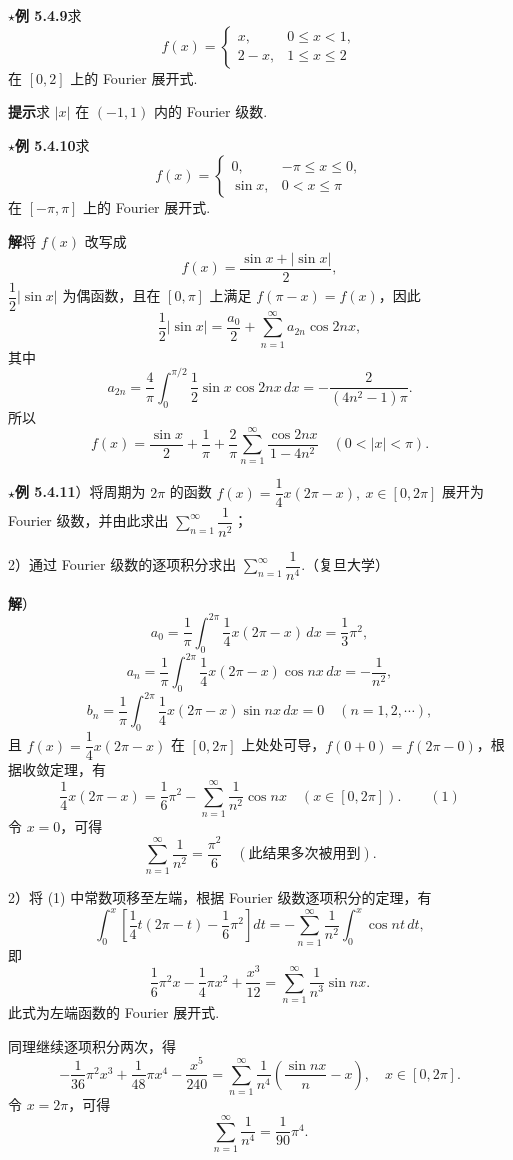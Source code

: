 \documentclass[UTF8, 12pt, fontset=fandol, oneside]{ctexart}
\begin{document}
\noindent\(\star\)\textbf{例 5.4.9}\quad 求
\[
  f(x)=
  \begin{cases}
  x,&0\le x<1,\\
  2-x,&1\le x\le2
  \end{cases}
\]
在 $[0,2]$ 上的 Fourier 展开式.

\noindent\textbf{提示}\quad 求 $|x|$ 在 $(-1,1)$ 内的 Fourier 级数.

\noindent\(\star\)\textbf{例 5.4.10}\quad 求
\[
  f(x)=
  \begin{cases}
  0,&-\pi\le x\le0,\\
  \sin x,&0<x\le\pi
  \end{cases}
\]
在 $[-\pi,\pi]$ 上的 Fourier 展开式.

\noindent\textbf{解}\quad 将 $f(x)$ 改写成
\[
  f(x)=\frac{\sin x+|\sin x|}{2},
\]
$\dfrac12|\sin x|$ 为偶函数，且在 $[0,\pi]$ 上满足 $f(\pi-x)=f(x)$，因此
\[
  \frac12|\sin x|=\frac{a_0}2+\sum_{n=1}^{\infty}a_{2n}\cos2nx,
\]
其中
\[
  a_{2n}=\frac4\pi\int_0^{\pi/2}\frac12\sin x\cos2nx\,dx
  =-\frac2{(4n^2-1)\pi}.
\]
所以
\[
  f(x)=\frac{\sin x}{2}+\frac1\pi+\frac2\pi
  \sum_{n=1}^{\infty}\frac{\cos2nx}{1-4n^2}\quad(0<|x|<\pi).
\]

\noindent\(\star\)\textbf{例 5.4.11}）将周期为 $2\pi$ 的函数 $f(x)=\dfrac14x(2\pi-x),\ x\in[0,2\pi]$ 展开为 Fourier 级数，并由此求出 $\displaystyle\sum_{n=1}^{\infty}\dfrac1{n^2}$；

2）通过 Fourier 级数的逐项积分求出 $\displaystyle\sum_{n=1}^{\infty}\dfrac1{n^4}$.（复旦大学）

\noindent\textbf{解}）
\[
  a_0=\frac1\pi\int_0^{2\pi}\frac14x(2\pi-x)\,dx=\frac13\pi^2,
\]
\[
  a_n=\frac1\pi\int_0^{2\pi}\frac14x(2\pi-x)\cos nx\,dx=-\frac1{n^2},
\]
\[
  b_n=\frac1\pi\int_0^{2\pi}\frac14x(2\pi-x)\sin nx\,dx=0\quad(n=1,2,\cdots),
\]
且 $f(x)=\dfrac14x(2\pi-x)$ 在 $[0,2\pi]$ 上处处可导，$f(0+0)=f(2\pi-0)$，根据收敛定理，有
\[
  \frac14x(2\pi-x)=\frac16\pi^2-\sum_{n=1}^{\infty}\frac1{n^2}\cos nx\quad(x\in[0,2\pi]). \qquad(1)
\]
令 $x=0$，可得
\[
  \sum_{n=1}^{\infty}\frac1{n^2}=\frac{\pi^2}{6}\quad(\text{此结果多次被用到}).
\]

2）将 (1) 中常数项移至左端，根据 Fourier 级数逐项积分的定理，有
\[
  \int_0^x\left[\frac14t(2\pi-t)-\frac16\pi^2\right]dt
  =-\sum_{n=1}^{\infty}\frac1{n^2}\int_0^x\cos nt\,dt,
\]
即
\[
  \frac16\pi^2x-\frac14\pi x^2+\frac{x^3}{12}
  =\sum_{n=1}^{\infty}\frac1{n^3}\sin nx.
\]
此式为左端函数的 Fourier 展开式.

同理继续逐项积分两次，得
\[
  -\frac1{36}\pi^2x^3+\frac1{48}\pi x^4-\frac{x^5}{240}
  =\sum_{n=1}^{\infty}\frac1{n^4}\left(\frac{\sin nx}{n}-x\right),\quad x\in[0,2\pi].
\]
令 $x=2\pi$，可得
\[
  \sum_{n=1}^{\infty}\frac1{n^4}=\frac1{90}\pi^4.
\]
\end{document}
